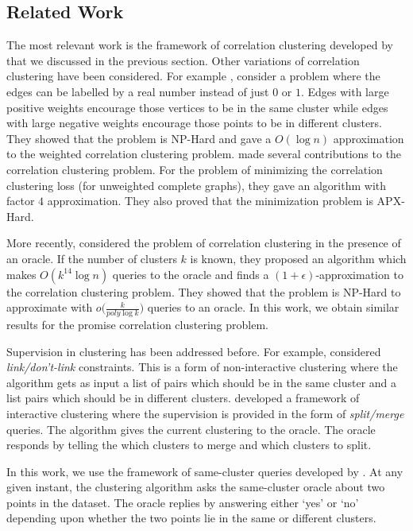 \documentclass[12pt]{article}
\begin{document}
\subsection{Related Work}
The most relevant work is the framework of correlation clustering developed by \cite{bansal2004correlation} that we discussed in the previous section. Other variations of correlation clustering have been considered. For example \cite{demaine2006correlation}, consider a problem where the edges can be labelled by a real number instead of just $0$ or $1$. Edges with large positive weights encourage those vertices to be in the same cluster while edges with large negative weights encourage those points to be in different clusters. They showed that the problem is NP-Hard and gave a $O(\log n)$ approximation to the weighted correlation clustering problem. \cite{charikar2005clustering} made several contributions to the correlation clustering problem. For the problem of minimizing the correlation clustering loss (for unweighted complete graphs), they gave an algorithm with factor $4$ approximation. They also proved that the minimization problem is APX-Hard. 

More recently, \cite{ailon2018approximate} considered the problem of correlation clustering in the presence of an oracle. If the number of clusters $k$ is known, they proposed an algorithm which makes $O(k^{14} \log n)$ queries to the oracle and finds a $(1+\epsilon)$-approximation to the correlation clustering problem. They showed that the problem is NP-Hard to approximate with $o\big(\frac{k}{poly \log k}\big)$ queries to an oracle. In this work, we obtain similar results for the {promise correlation clustering} problem.

Supervision in clustering has been addressed before. For example, \cite{kulis2009semi,basu2004probabilistic,basu2002semi} considered {\em link/don't-link} constraints. This is a form of non-interactive clustering where the algorithm gets as input a list of pairs which should be in the same cluster and a list pairs which should be in different clusters. \cite{balcan2008clustering} developed a framework of interactive clustering where the supervision is provided in the form of {\em split/merge} queries. The algorithm gives the current clustering to the oracle. The oracle responds by telling the which clusters to merge and which clusters to split. 

In this work, we use the framework of same-cluster queries developed by \cite{ashtiani2016clustering}. At any given instant, the clustering algorithm asks the same-cluster oracle about two points in the dataset. The oracle replies by answering either `yes' or `no' depending upon whether the two points lie in the same or different clusters. 
\end{document}
